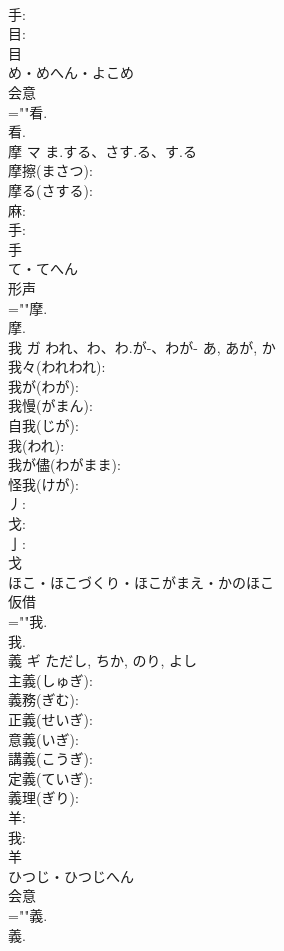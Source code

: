 \documentclass[8pt]{extreport}
\begin{document}
\begin{CJK}{UTF8}{min}
\\	手: 
\\	目: 
\\	目	
\\	め・めへん・よこめ	
\\	会意 
\\	=""看.
\\	看.
\\	摩	マ	ま.する、さす.る、す.る		
\\	摩擦(まさつ): 
\\	摩る(さする): 
\\	麻: 
\\	手: 
\\	手	
\\	て・てへん	
\\	形声 
\\	=""摩.
\\	摩.
\\	我	ガ	われ、わ、わ.が-、わが-	あ, あが, か	
\\	我々(われわれ): 
\\	我が(わが): 
\\	我慢(がまん): 
\\	自我(じが): 
\\	我(われ): 
\\	我が儘(わがまま): 
\\	怪我(けが): 
\\	丿: 
\\	戈: 
\\	亅: 
\\	戈	
\\	ほこ・ほこづくり・ほこがまえ・かのほこ	
\\	仮借 
\\	=""我.
\\	我.
\\	義	ギ		ただし, ちか, のり, よし	
\\	主義(しゅぎ): 
\\	義務(ぎむ): 
\\	正義(せいぎ): 
\\	意義(いぎ): 
\\	講義(こうぎ): 
\\	定義(ていぎ): 
\\	義理(ぎり): 
\\	羊: 
\\	我: 
\\	羊	
\\	ひつじ・ひつじへん	
\\	会意 
\\	=""義.
\\	義.

\end{CJK}
\end{document}
